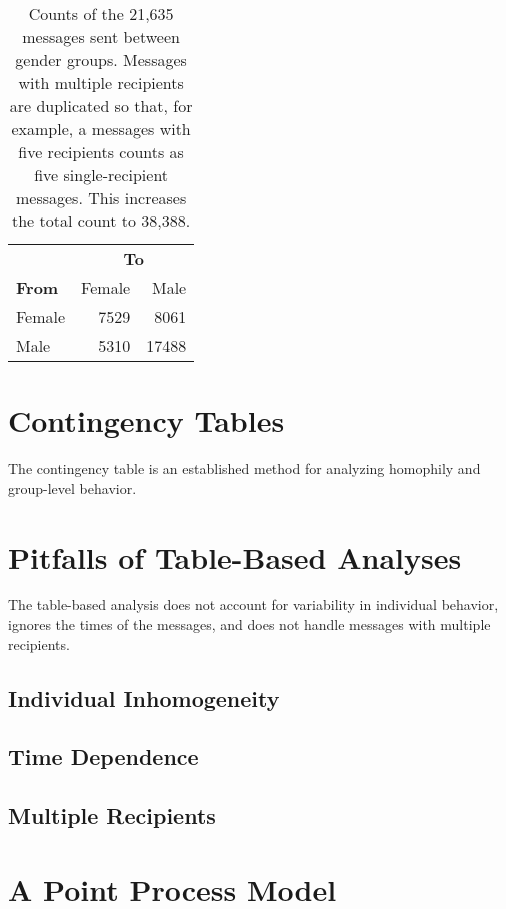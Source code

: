 \documentclass[aoas,preprint]{imsart}
\begin{document}
\begin{table}[h]
    \begin{tabular}{lrr}
        \toprule
        & \multicolumn{2}{c}{\textbf{To}} \\
        \cmidrule(l){2-3}
        \textbf{From} & Female & Male  \\
        \midrule
        Female & 7529   &  8061 \\
        Male   & 5310   & 17488 \\
        \bottomrule
    \end{tabular}
    \caption{
        Counts of the 21,635 messages sent between gender groups.  Messages
        with multiple recipients are duplicated so that, for example,
        a messages with five recipients counts as five single-recipient
        messages.  This increases the total count to 38,388.
    }
    \label{T:gender-send-counts}
\end{table}

\section{Contingency Tables}

The contingency table is an established method for analyzing homophily and
group-level behavior.

\section{Pitfalls of Table-Based Analyses}

The table-based analysis does not account for variability in individual
behavior, ignores the times of the messages, and does not handle messages with
multiple recipients.

\subsection{Individual Inhomogeneity}
\subsection{Time Dependence}
\subsection{Multiple Recipients}


\section{A Point Process Model}\label{S:point-process-model}
\end{document}
